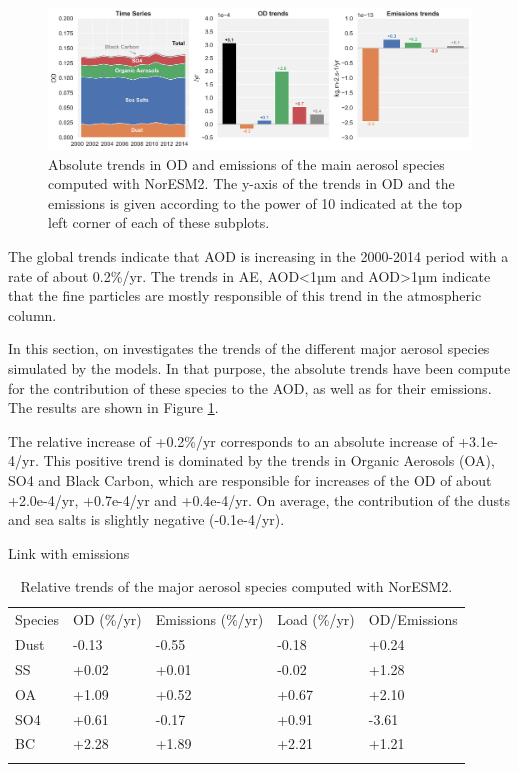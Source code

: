 \documentclass[journal abbreviation, manuscript]{copernicus}
\begin{document}
\begin{figure}[t]
 \includegraphics[width=16cm]{../scripts/figs/abs_species_trends.png}
 \caption{Absolute trends in OD and emissions of the main aerosol species computed with NorESM2. The y-axis of the trends in OD and the emissions is given according to the power of 10 indicated at the top left corner of each of these subplots.}
 \label{fig:species}
\end{figure}

The global trends indicate that AOD is increasing in the 2000-2014 period with a rate of about 0.2\%/yr. The trends in AE, AOD<1µm and AOD>1µm indicate that the fine particles are mostly responsible of this trend in the atmospheric column.

In this section, on investigates the trends of the different major aerosol species simulated by the models. In that purpose, the absolute trends have been compute for the contribution of these species to the AOD, as well as for their emissions. The results are shown in Figure \ref{fig:species}.

The relative increase of +0.2\%/yr corresponds to an absolute increase of +3.1e-4/yr. This positive trend is dominated by the trends in Organic Aerosols (OA), SO4 and Black Carbon, which are responsible for increases of the OD of about +2.0e-4/yr, +0.7e-4/yr and +0.4e-4/yr. On average, the contribution of the dusts and sea salts is slightly negative (-0.1e-4/yr).

Link with emissions

\begin{table}[]
 \centering
 \begin{tabular}{lllll}
  \tophline
  Species & OD (\%/yr) & Emissions (\%/yr) & Load (\%/yr) & OD/Emissions \\
  \middlehline
  Dust    & -0.13      & -0.55             & -0.18        & +0.24        \\
  SS      & +0.02      & +0.01             & -0.02        & +1.28        \\
  OA      & +1.09      & +0.52             & +0.67        & +2.10        \\
  SO4     & +0.61      & -0.17             & +0.91        & -3.61        \\
  BC      & +2.28      & +1.89             & +2.21        & +1.21        \\
  \bottomhline
 \end{tabular}
 \caption{Relative trends of the major aerosol species computed with NorESM2.}
 \label{tab:species}
\end{table}
\end{document}
